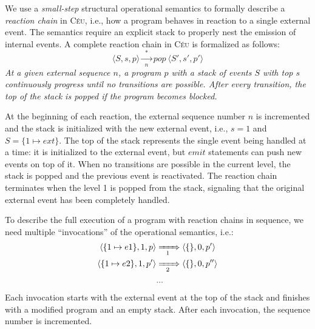\documentclass{acm_proc_article-sp}
\newcommand{\CEU}{\textsc{C\'{e}u}\xspace}
\newcommand{\LL}{\langle}
\newcommand{\RR}{\rangle}
\newcommand{\1}{\;}
\newcommand{\2}{\;\;}
\newcommand{\3}{\;\;\;}
\newcommand{\5}{\;\;\;\;\;}
\begin{document}

We use a \emph{small-step} structural operational semantics to formally 
describe a \emph{reaction chain} in \CEU, i.e., how a program behaves in 
reaction to a single external event.
%
The semantics require an explicit stack to properly nest the emission of 
internal events.
%
A complete reaction chain in \CEU is formalized as follows:
%
$$
\LL S, s, p \RR
    \xrightarrow[~~n~~]{~~*~~}
pop~\LL S', s', p' \RR
$$
%
\emph{At a given external sequence $n$, a program $p$ with a stack of events 
$S$ with top $s$ continuously progress until no transitions are possible.
After every transition, the top of the stack is popped if the program becomes 
blocked.}

At the beginning of each reaction, the external sequence number $n$ is 
incremented and the stack is initialized with the new external event, i.e., 
$s=1$ and $S=\{ 1 \mapsto ext \}$.
%
%
The top of the stack represents the single event being handled at a time:
it is initialized to the external event, but $emit$ statements can push new 
events on top of it.
When no transitions are possible in the current level, the stack is popped and 
the previous event is reactivated.
The reaction chain terminates when the level 1 is popped from the stack, 
signaling that the original external event has been completely handled.

To describe the full execution of a program with reaction chains in sequence, 
we need multiple ``invocations'' of the operational semantics, i.e.:
%
\begin{align*}
\LL \{ 1 \mapsto e1 \}, 1, p \RR
    & \xRightarrow[~~1~~]{}
\LL \{\}, 0, p' \RR
\\
\LL \{ 1 \mapsto e2 \}, 1, p' \RR
    & \xRightarrow[~~2~~]{}
\LL \{\}, 0, p'' \RR
\\
& ...
\end{align*}
%
Each invocation starts with the external event at the top of the stack and 
finishes with a modified program and an empty stack.
After each invocation, the sequence number is incremented.
\end{document}
